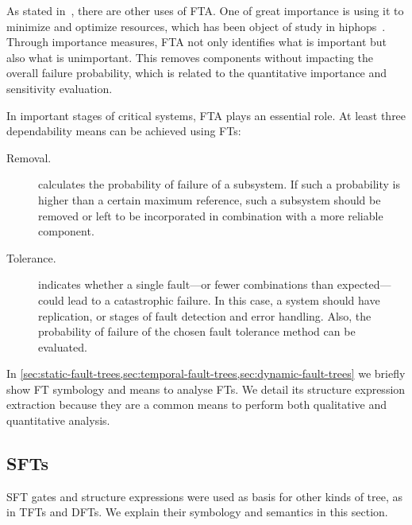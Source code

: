\documentclass[12pt,openright,twoside,a4paper,oldfontcommands,english,brazil,final]{abntex2}
\theoremstyle{theo}
\begin{document}
As stated in~\cite{SVD+2002}, there are other uses of \ac{FTA}.
One of great importance is using it to minimize and optimize resources, which has been object of study in \ac{hiphops}~\cite{APS+2011}.
Through importance measures, \ac{FTA} not only identifies what is important but also what is unimportant.
This removes components without impacting the overall failure probability, which is related to the quantitative importance and sensitivity evaluation.

\begin{sloppypar}
In important stages of critical systems, \ac{FTA} plays an essential role.
At least three dependability means can be achieved using \acp{FT}:
%
\begin{description}
  \item[Removal.]
   calculates the probability of failure of a subsystem.
   If such a probability is higher than a certain maximum reference, such a subsystem should be removed or left to be incorporated in combination with a more reliable component.
  \item[Tolerance.]
   indicates whether a single fault---or fewer combinations than expected---could lead to a catastrophic failure.
  In this case, a system should have replication, or stages of fault detection and error handling.
  Also, the probability of failure of the chosen fault tolerance method can be evaluated.
\end{description}
\end{sloppypar}

In \cref{sec:static-fault-trees,sec:temporal-fault-trees,sec:dynamic-fault-trees} we briefly show \ac{FT} symbology and means to analyse \acp{FT}.
We detail its structure expression extraction because they are a common means to perform both qualitative and quantitative analysis.

\subsection{\Aclp*{SFT}}
\label{sec:static-fault-trees}

\Ac{SFT} gates and structure expressions were used as basis for other kinds of tree, as in \acp{TFT} and \acp{DFT}.
We explain their symbology and semantics in this section.
\end{document}
